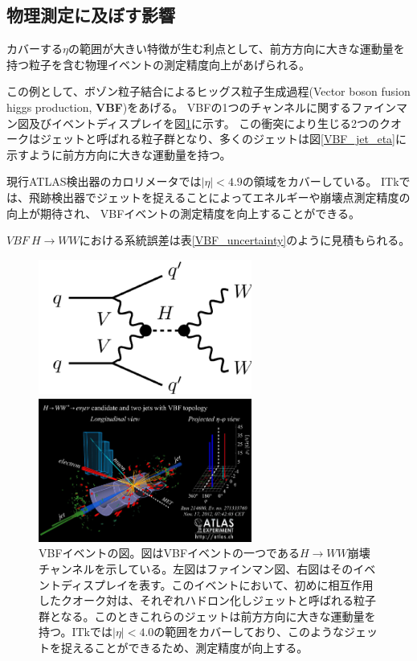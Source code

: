 \clearpage
\subsection{物理測定に及ぼす影響}
カバーする$\eta$の範囲が大きい特徴が生む利点として、前方方向に大きな運動量を持つ粒子を含む物理イベントの測定精度向上があげられる。

この例として、ボゾン粒子結合によるヒッグス粒子生成過程(Vector boson fusion higgs production, \textbf{VBF})をあげる。
VBFの1つのチャンネルに関するファインマン図及びイベントディスプレイを図\ref{VBF_image}に示す。
この衝突により生じる2つのクオークはジェットと呼ばれる粒子群となり、多くのジェットは図\ref{VBF_jet_eta}に示すように前方方向に大きな運動量を持つ。

現行ATLAS検出器のカロリメータでは$|\eta|<4.9$の領域をカバーしている。
ITkでは、飛跡検出器でジェットを捉えることによってエネルギーや崩壊点測定精度の向上が期待され、
VBFイベントの測定精度を向上することができる。

$VBF~H\rightarrow WW$における系統誤差は表\ref{VBF_uncertainty}のように見積もられる\cite{1-3}。

\begin{figure}[bpt]
  \begin{minipage}{0.5\hsize}
    \begin{center}
    \includegraphics[width=70mm]{./VBF_fainman.png}
    \end{center}
  \end{minipage}
  \begin{minipage}{0.5\hsize}
    \begin{center}
    \includegraphics[width=70mm]{./VBF_event_display.png}
    \end{center}
  \end{minipage}
  \caption[VBFイベントの図]{VBFイベントの図\cite{1-8}。図はVBFイベントの一つである$H\rightarrow WW$崩壊チャンネルを示している。左図はファインマン図、右図はそのイベントディスプレイを表す。このイベントにおいて、初めに相互作用したクオーク対は、それぞれハドロン化しジェットと呼ばれる粒子群となる。このときこれらのジェットは前方方向に大きな運動量を持つ。ITkでは$|\eta|<4.0$の範囲をカバーしており、このようなジェットを捉えることができるため、測定精度が向上する。}
  \label{VBF_image}
\end{figure}

